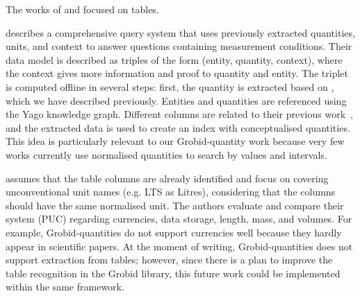 The works of \cite{taha2021identifying} and \cite{ho2021qute} focused on tables.

\cite{ho2021qute} describes a comprehensive query system that uses previously extracted quantities, units, and context to answer questions containing measurement conditions. 
Their data model is described as triples of the form (entity, quantity, context), where the context gives more information and proof to quantity and entity. 
The triplet is computed offline in several steps: first, the quantity is extracted based on \cite{roy2015reasoning}, which we have described previously. 
Entities and quantities are referenced using the Yago knowledge graph. Different columns are related to their previous work~\cite{ho2021extracting}, and the extracted data is used to create an index with conceptualised quantities. 
This idea is particularly relevant to our Grobid-quantity work because very few works currently use normalised quantities to search by values and intervals. 

\cite{taha2021identifying} assumes that the table columns are already identified and focus on covering unconventional unit names (e.g. LTS as Litres), considering that the columns should have the same normalised unit. The authors evaluate and compare their system (PUC) regarding currencies, data storage, length, mass, and volumes. For example, Grobid-quantities do not support currencies well because they hardly appear in scientific papers. At the moment of writing, Grobid-quantities does not support extraction from tables; however, since there is a plan to improve the table recognition in the Grobid library, this future work could be implemented within the same framework. 


